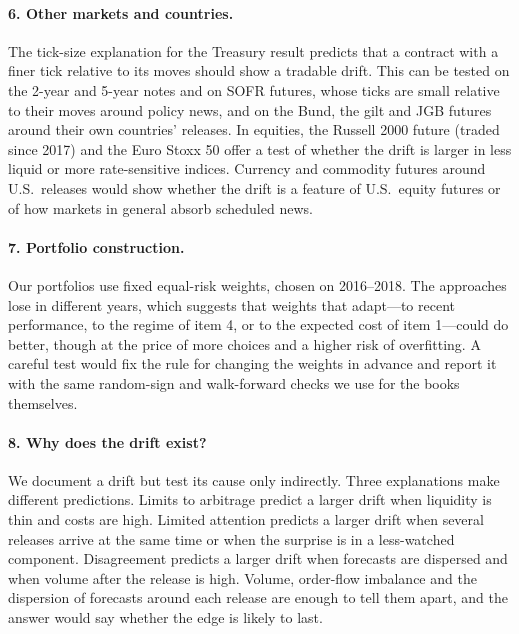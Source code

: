 \paragraph{6. Other markets and countries.} The tick-size explanation for the Treasury result
predicts that a contract with a finer tick relative to its moves should show a tradable drift. This
can be tested on the 2-year and 5-year notes and on SOFR futures, whose ticks are small relative to
their moves around policy news, and on the Bund, the gilt and JGB futures around their own countries'
releases. In equities, the Russell 2000 future (traded since 2017) and the Euro Stoxx 50 offer a
test of whether the drift is larger in less liquid or more rate-sensitive indices. Currency and
commodity futures around U.S.\ releases would show whether the drift is a feature of U.S.\ equity
futures or of how markets in general absorb scheduled news.

\paragraph{7. Portfolio construction.} Our portfolios use fixed equal-risk weights, chosen on
2016--2018. The approaches lose in different years, which suggests that weights that adapt---to recent
performance, to the regime of item 4, or to the expected cost of item 1---could do better, though at
the price of more choices and a higher risk of overfitting. A careful test would fix the rule for
changing the weights in advance and report it with the same random-sign and walk-forward checks we
use for the books themselves.

\paragraph{8. Why does the drift exist?} We document a drift but test its cause only indirectly.
Three explanations make different predictions. Limits to arbitrage predict a larger drift when
liquidity is thin and costs are high. Limited attention predicts a larger drift when several releases
arrive at the same time or when the surprise is in a less-watched component. Disagreement predicts a
larger drift when forecasts are dispersed and when volume after the release is high. Volume, order-flow
imbalance and the dispersion of forecasts around each release are enough to tell them apart, and the
answer would say whether the edge is likely to last.
